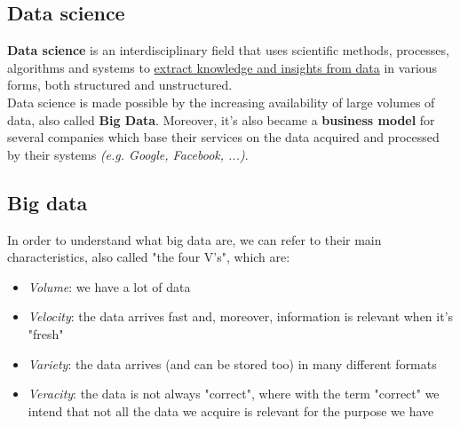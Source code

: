 \subsection{Data science}
\textbf{Data science} is an interdisciplinary field that uses scientific methods, processes, algorithms and systems to \underline{extract knowledge and insights from data} in various forms, both structured and unstructured.\\
Data science is made possible by the increasing availability of large volumes of data, also called \textbf{Big Data}. Moreover, it's also became a \textbf{business model} for several companies which base their services on the data acquired and processed by their systems \textit{(e.g. Google, Facebook, ...)}.

\subsection{Big data}
In order to understand what big data are, we can refer to their main characteristics, also called "the four V's", which are:
\begin{itemize}
    \item \textit{Volume}: we have a lot of data
    \item \textit{Velocity}: the data arrives fast and, moreover, information is relevant when it's "fresh"
    \item \textit{Variety}: the data arrives (and can be stored too) in many different formats
    \item \textit{Veracity}: the data is not always "correct", where with the term "correct" we intend that not all the data we acquire is relevant for the purpose we have
\end{itemize}